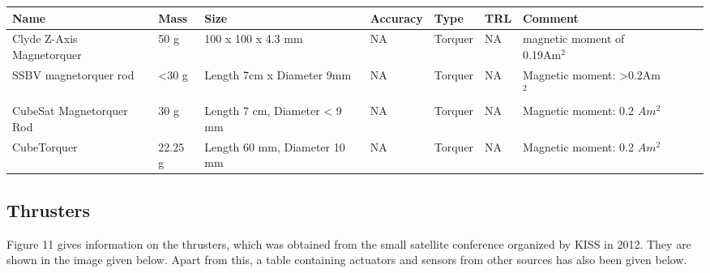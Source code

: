 \begin{center}
     \begin{tabular}{ |p{2cm} | p{1cm} | p{2cm} |  p{2cm} | l | p{2cm} | l | p{4cm} | p{1cm} | p{2cm} |  }
     \hline

      {\bf Name} & {\bf Mass} & {\bf Size} & {\bf Accuracy} & {\bf Type} & {\bf TRL} & {\bf Comment}  \\ \hline
      
       Clyde Z-Axis Magnetorquer & 50 g & 100 x 100 x 4.3 mm & NA & Torquer & NA & magnetic moment of 0.19Am$^2$ \\ \hline
       
	   SSBV magnetorquer rod & <30 g & Length 7cm x Diameter 9mm & NA & Torquer & NA & Magnetic moment: >0.2Am$^2$ \\ \hline
	   
	   CubeSat Magnetorquer Rod \cite{CubeShop} & 30 g & Length 7 cm, Diameter < 9 mm & NA & Torquer & NA & Magnetic moment: 0.2 $Am^2$ \\ \hline
	   
	   CubeTorquer \cite{CubeShop} & 22.25 g & Length 60 mm, Diameter 10 mm & NA & Torquer & NA & Magnetic moment: 0.2 $Am^2$ \\ \hline	 
     \end{tabular}
\end{center}

\subsection{Thrusters}

Figure 11 gives information on the thrusters, which was obtained from the small satellite conference organized by KISS in 2012. They are shown in the image given below.  Apart from this, a table containing actuators and sensors from other sources has also been given below.


